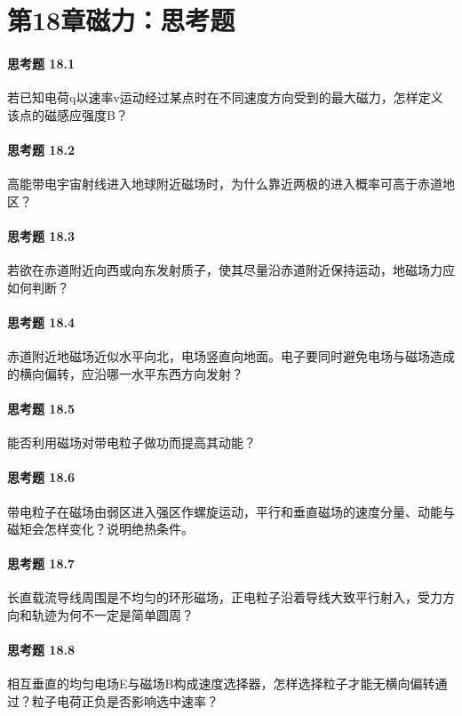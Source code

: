 \section*{第18章\quad 磁力：思考题}
\paragraph{思考题 18.1}
若已知电荷q以速率v运动经过某点时在不同速度方向受到的最大磁力，怎样定义该点的磁感应强度B？

\paragraph{思考题 18.2}
高能带电宇宙射线进入地球附近磁场时，为什么靠近两极的进入概率可高于赤道地区？

\paragraph{思考题 18.3}
若欲在赤道附近向西或向东发射质子，使其尽量沿赤道附近保持运动，地磁场力应如何判断？

\paragraph{思考题 18.4}
赤道附近地磁场近似水平向北，电场竖直向地面。电子要同时避免电场与磁场造成的横向偏转，应沿哪一水平东西方向发射？

\paragraph{思考题 18.5}
能否利用磁场对带电粒子做功而提高其动能？

\paragraph{思考题 18.6}
带电粒子在磁场由弱区进入强区作螺旋运动，平行和垂直磁场的速度分量、动能与磁矩会怎样变化？说明绝热条件。

\paragraph{思考题 18.7}
长直载流导线周围是不均匀的环形磁场，正电粒子沿着导线大致平行射入，受力方向和轨迹为何不一定是简单圆周？

\paragraph{思考题 18.8}
相互垂直的均匀电场E与磁场B构成速度选择器，怎样选择粒子才能无横向偏转通过？粒子电荷正负是否影响选中速率？

